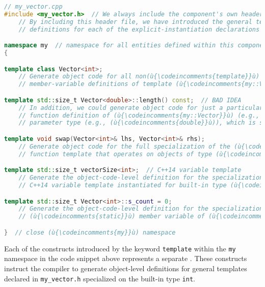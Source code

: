 \begin{lstlisting}[language=C++]
// my_vector.cpp
#include <my_vector.h>  // We always include the component's own header first.
    // By including this header file, we have introduced the general template
    // definitions for each of the explicit-instantiation declarations below.

namespace my  // namespace for all entities defined within this component
{

template class Vector<int>;
    // Generate object code for all non(ù{\codeincomments{template}}ù) member-function and (ù{\codeincomments{static}}ù)
    // member-variable definitions of template (ù{\codeincomments{my::Vector}}ù) having (ù{\codeincomments{int}}ù) elements.

template std::size_t Vector<double>::length() const;  // BAD IDEA
    // In addition, we could generate object code for just a particular member
    // function definition of (ù{\codeincomments{my::Vector}}ù) (e.g., (ù{\codeincomments{length}}ù)) for some other
    // parameter type (e.g., (ù{\codeincomments{double}}ù)), which is shown here for pedagogy only.

template void swap(Vector<int>& lhs, Vector<int>& rhs);
    // Generate object code for the full specialization of the (ù{\codeincomments{swap}}ù) free-
    // function template that operates on objects of type (ù{\codeincomments{my::Vector<int>}}ù).

template std::size_t vectorSize<int>;  // C++14 variable template
    // Generate the object-code-level definition for the specialization of the
    // C++14 variable template instantiated for built-in type (ù{\codeincomments{int}}ù).

template std::size_t Vector<int>::s_count = 0;
    // Generate the object-code-level definition for the specialization of the
    // (ù{\codeincomments{static}}ù) member variable of (ù{\codeincomments{Vector}}ù) instantiated for built-in type (ù{\codeincomments{int}}ù).

}  // close (ù{\codeincomments{my}}ù) namespace
\end{lstlisting}
    
\noindent Each of the constructs introduced by the keyword \lstinline!template!
within the \lstinline!my! namespace in the code snippet above represents a
separate . These
constructs instruct the compiler to generate object-level definitions
for general templates declared in \lstinline!my_vector.h! specialized on
the built-in type \lstinline!int!.

